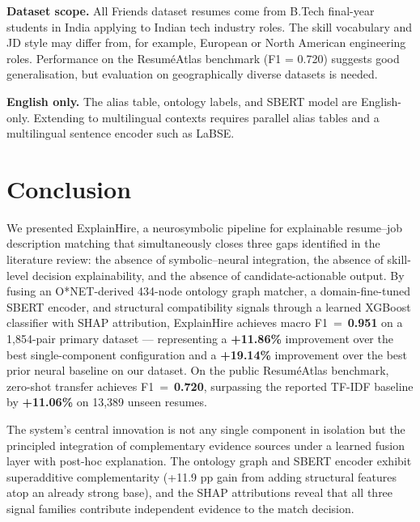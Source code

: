 \documentclass[conference]{IEEEtran}
\begin{document}
\textbf{Dataset scope.}
All Friends dataset resumes come from B.Tech final-year students in India
applying to Indian tech industry roles. The skill vocabulary and JD style
may differ from, for example, European or North American engineering roles.
Performance on the Resum\'eAtlas benchmark (F1 = 0.720) suggests good
generalisation, but evaluation on geographically diverse datasets is needed.

\textbf{English only.}
The alias table, ontology labels, and SBERT model are English-only. Extending
to multilingual contexts requires parallel alias tables and a multilingual
sentence encoder such as LaBSE.

\section{Conclusion}
\label{sec:conclusion}

We presented ExplainHire, a neurosymbolic pipeline for explainable
resume--job description matching that simultaneously closes three gaps
identified in the literature review: the absence of symbolic--neural
integration, the absence of skill-level decision explainability, and
the absence of candidate-actionable output. By fusing an O*NET-derived
434-node ontology graph matcher, a domain-fine-tuned SBERT encoder, and
structural compatibility signals through a learned XGBoost classifier
with SHAP attribution, ExplainHire achieves macro F1~=~\textbf{0.951}
on a 1,854-pair primary dataset --- representing a \textbf{+11.86\%}
improvement over the best single-component configuration and a
\textbf{+19.14\%} improvement over the best prior neural baseline on
our dataset. On the public Resum\'eAtlas benchmark, zero-shot transfer
achieves F1~=~\textbf{0.720}, surpassing the reported TF-IDF baseline
by \textbf{+11.06\%} on 13,389 unseen resumes.

The system's central innovation is not any single component in isolation
but the principled integration of complementary evidence sources under a
learned fusion layer with post-hoc explanation. The ontology graph and
SBERT encoder exhibit superadditive complementarity (+11.9 pp gain from
adding structural features atop an already strong base), and the SHAP
attributions reveal that all three signal families contribute independent
evidence to the match decision.
\end{document}
